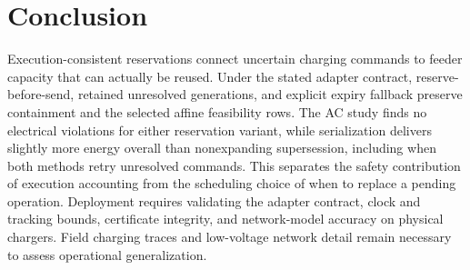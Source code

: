 \section{Conclusion}
Execution-consistent reservations connect uncertain charging commands to feeder
capacity that can actually be reused. Under the stated adapter contract,
reserve-before-send, retained unresolved generations, and explicit expiry
fallback preserve containment and the selected affine feasibility rows.
The AC study finds no electrical violations for either reservation variant,
while serialization delivers slightly more energy overall than nonexpanding
supersession, including when both methods retry unresolved commands.
This separates the safety contribution of execution accounting
from the scheduling choice of when to replace a pending operation.
Deployment requires validating the adapter contract,
clock and tracking bounds, certificate integrity, and network-model accuracy on
physical chargers. Field charging traces and low-voltage network detail remain
necessary to assess operational generalization.
